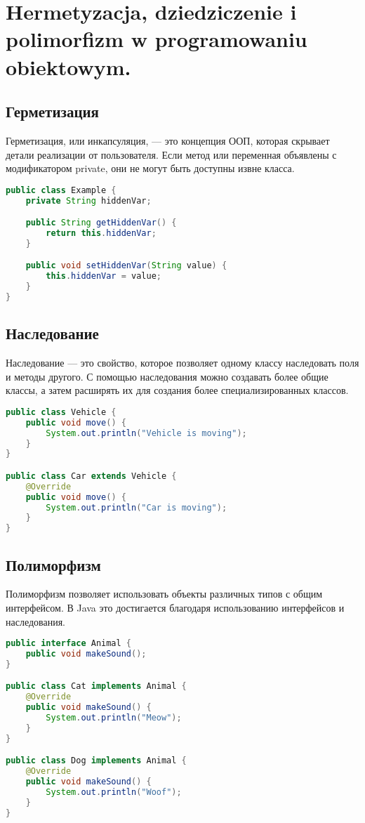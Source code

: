 \section{Hermetyzacja, dziedziczenie i polimorfizm w programowaniu obiektowym.}

\subsection*{Герметизация}

Герметизация, или инкапсуляция, — это концепция ООП, которая скрывает детали реализации от пользователя. Если метод или переменная объявлены с модификатором private, они не могут быть доступны извне класса.

\begin{lstlisting}[language=Java]
public class Example {
    private String hiddenVar;

    public String getHiddenVar() {
        return this.hiddenVar;
    }

    public void setHiddenVar(String value) {
        this.hiddenVar = value;
    }
}
\end{lstlisting}

\subsection*{Наследование}

Наследование — это свойство, которое позволяет одному классу наследовать поля и методы другого. С помощью наследования можно создавать более общие классы, а затем расширять их для создания более специализированных классов.

\begin{lstlisting}[language=Java]
public class Vehicle {
    public void move() {
        System.out.println("Vehicle is moving");
    }
}

public class Car extends Vehicle {
    @Override
    public void move() {
        System.out.println("Car is moving");
    }
}
\end{lstlisting}

\subsection*{Полиморфизм}

Полиморфизм позволяет использовать объекты различных типов с общим интерфейсом. В Java это достигается благодаря использованию интерфейсов и наследования.

\begin{lstlisting}[language=Java]
public interface Animal {
    public void makeSound();
}

public class Cat implements Animal {
    @Override
    public void makeSound() {
        System.out.println("Meow");
    }
}

public class Dog implements Animal {
    @Override
    public void makeSound() {
        System.out.println("Woof");
    }
}
\end{lstlisting}


